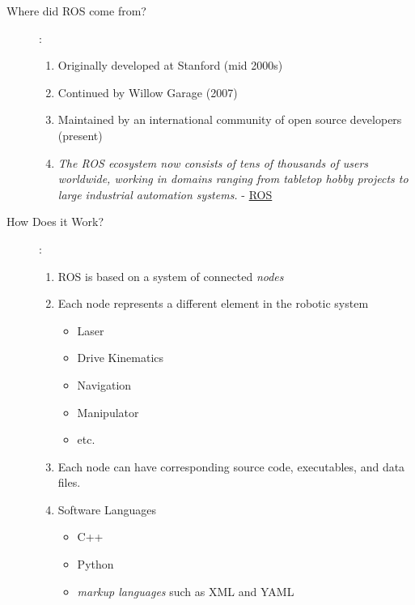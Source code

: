 \documentclass[12pt]{article}
\begin{document}
\begin{description}
        \item[Where did ROS come from?]:
            \begin{enumerate}
                \item Originally developed at Stanford (mid 2000s)
                \item Continued by Willow Garage (2007)
                \item Maintained by an international community of open source developers (present)
                \item {\it The ROS ecosystem now consists of tens of thousands of users worldwide, working in domains ranging from tabletop hobby projects to large industrial automation systems.} - \href{http://www.ros.org/history/}{ROS}
            \end{enumerate} 

            \newpage
            
            \item [How Does it Work?]:
            \begin{enumerate}
                \item ROS is based on a system of connected {\it nodes} 
                \item Each node represents a different element in the robotic system
                   
                   \begin{itemize}
                        \item Laser
                        \item Drive Kinematics
                        \item Navigation
                        \item Manipulator
                        \item etc.
                    \end{itemize}
                \vspace{15mm}
                \item Each node can have corresponding source code, executables, and data files.\\
\item Software Languages
                \begin{itemize}
                \item C++ 
                \item Python
                \item {\it markup languages} such as XML and YAML\\
                 \end{itemize}
                 

\end{enumerate}
\end{description}
\end{document}
